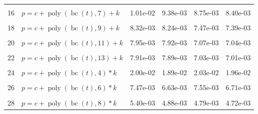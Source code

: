 \documentclass[12pt,a4paper]{article}
\DeclareMathOperator{\bc}{bc}
\DeclareMathOperator{\poly}{poly}
\begin{document}
\begin{longtable}[t]{ll>{\raggedleft\arraybackslash}p{2cm}>{\raggedleft\arraybackslash}p{2cm}>{\raggedleft\arraybackslash}p{2cm}>{\raggedleft\arraybackslash}p{2cm}}
\cellcolor{gray!6}{15} & \cellcolor{gray!6}{$p = c + \poly\left( \bc(t), 6 \right) + k$} & \cellcolor{gray!6}{1.03e-02} & \cellcolor{gray!6}{9.67e-03} & \cellcolor{gray!6}{9.52e-03} & \cellcolor{gray!6}{8.87e-03}\\
16 & $p = c + \poly\left( \bc(t), 7 \right) + k$ & 1.01e-02 & 9.38e-03 & 8.75e-03 & 8.40e-03\\
\cellcolor{gray!6}{17} & \cellcolor{gray!6}{$p = c + \poly\left( \bc(t), 8 \right) + k$} & \cellcolor{gray!6}{8.96e-03} & \cellcolor{gray!6}{8.64e-03} & \cellcolor{gray!6}{7.57e-03} & \cellcolor{gray!6}{7.54e-03}\\
18 & $p = c + \poly\left( \bc(t), 9 \right) + k$ & 8.32e-03 & 8.24e-03 & 7.47e-03 & 7.39e-03\\
\cellcolor{gray!6}{19} & \cellcolor{gray!6}{$p = c + \poly\left( \bc(t), 10 \right) + k$} & \cellcolor{gray!6}{8.03e-03} & \cellcolor{gray!6}{7.99e-03} & \cellcolor{gray!6}{7.08e-03} & \cellcolor{gray!6}{7.07e-03}\\
20 & $p = c + \poly\left( \bc(t), 11 \right) + k$ & 7.95e-03 & 7.92e-03 & 7.07e-03 & 7.04e-03\\
\cellcolor{gray!6}{21} & \cellcolor{gray!6}{$p = c + \poly\left( \bc(t), 12 \right) + k$} & \cellcolor{gray!6}{7.93e-03} & \cellcolor{gray!6}{7.90e-03} & \cellcolor{gray!6}{7.04e-03} & \cellcolor{gray!6}{7.02e-03}\\
22 & $p = c + \poly\left( \bc(t), 13 \right) + k$ & 7.91e-03 & 7.89e-03 & 7.03e-03 & 7.01e-03\\
\cellcolor{gray!6}{23} & \cellcolor{gray!6}{$p = c + \poly\left( \bc(t), 3 \right) * k$} & \cellcolor{gray!6}{3.27e-02} & \cellcolor{gray!6}{2.00e-02} & \cellcolor{gray!6}{2.14e-02} & \cellcolor{gray!6}{1.99e-02}\\
24 & $p = c + \poly\left( \bc(t), 4 \right) * k$ & 2.00e-02 & 1.89e-02 & 2.03e-02 & 1.96e-02\\
\cellcolor{gray!6}{25} & \cellcolor{gray!6}{$p = c + \poly\left( \bc(t), 5 \right) * k$} & \cellcolor{gray!6}{1.68e-02} & \cellcolor{gray!6}{1.62e-02} & \cellcolor{gray!6}{1.39e-02} & \cellcolor{gray!6}{1.37e-02}\\
26 & $p = c + \poly\left( \bc(t), 6 \right) * k$ & 7.47e-03 & 6.63e-03 & 7.55e-03 & 6.71e-03\\
\cellcolor{gray!6}{27} & \cellcolor{gray!6}{$p = c + \poly\left( \bc(t), 7 \right) * k$} & \cellcolor{gray!6}{7.03e-03} & \cellcolor{gray!6}{6.06e-03} & \cellcolor{gray!6}{6.42e-03} & \cellcolor{gray!6}{5.96e-03}\\
28 & $p = c + \poly\left( \bc(t), 8 \right) * k$ & 5.40e-03 & 4.88e-03 & 4.79e-03 & 4.72e-03\\

\end{longtable}
\end{document}
